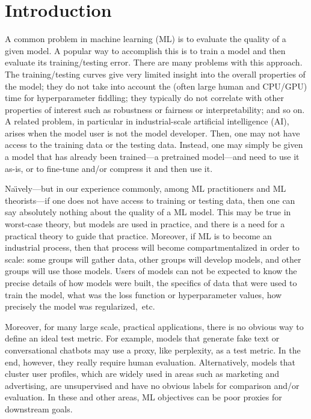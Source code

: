 \section{Introduction}
\label{sxn:intro}

A common problem in machine learning (ML) 
is to evaluate the quality of a given model.
A popular way to accomplish this
is to train a model and then evaluate its training/testing error.
There are many problems with this approach.
The training/testing curves give very limited insight into the overall properties of the model; 
they do not take into account the (often large human and CPU/GPU) time for hyperparameter fiddling;
they typically do not correlate with other properties of interest such as robustness or fairness or interpretability; 
and so on.
A related problem, in particular in industrial-scale artificial intelligence (AI), arises when the model user is not the model developer.
Then, one may not have access to the training data or the testing data.
Instead, one may simply be given a model that has already been trained---a pretrained model---and need to use it as-is, or to fine-tune and/or compress it and then use it.

Na\"{\i}vely---but in our experience commonly, among ML practitioners and ML theorists---if one does not have access to training or testing data, then one can say absolutely nothing about the quality of a ML model.
This may be true in worst-case theory, but models are used in practice, and there is a need for a practical theory to guide that practice.
Moreover, if ML is to become an industrial process, then that process will become compartmentalized in order to scale: some groups will gather data, other groups will develop models, and other groups will use those models.
Users of models can not be expected to know the precise details of how models were built, the specifics of data that were used to train the model, what was the loss function or hyperparameter values, how precisely the model was regularized,~etc.

Moreover, for many large scale, practical applications, there is no obvious way to define an ideal test metric. 
For example, models that generate fake text or conversational chatbots may use a proxy, like perplexity, as a test metric.
In the end, however, they really require human evaluation. 
Alternatively, models that cluster user profiles, which are widely used in areas such as marketing and advertising, are unsupervised and have no obvious labels for comparison and/or evaluation.
In these and other areas, ML objectives can be poor proxies for downstream goals.

